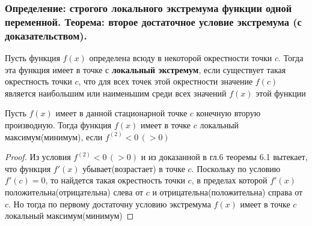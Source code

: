 \documentclass[10pt]{article}
\begin{document}



    \subsubsection{Определение: строгого локального экстремума функции одной переменной. Теорема: второе достаточное условие экстремума (с доказательством).}
    \begin{definition}
        Пусть функция $f(x)$ определена всюду в некоторой окрестности точки $c$. Тогда эта функция имеет в точке с \textbf{локальный экстремум}, если существует такая окрестность точки $c$, что для всех точек этой окрестности значение $f(c)$ является наибольшим или наименьшим среди всех значений $f(x)$ этой функции
    \end{definition}
    \begin{theorem}
        Пусть $f(x)$ имеет в данной стационарной точке $c$ конечную вторую производную. Тогда функция $f(x)$ имеет в точке $c$ локальный максимум(минимум), если $f^{(2)} < 0\,(>0)$ 
    \end{theorem}
    \begin{proof}
        Из условия $f^{(2)} < 0\,(>0)$ и из доказанной в гл.6 теоремы 6.1 вытекает, что функция $f'(x)$ убывает(возрастает) в точке $c$. Поскольку по условию $f'(c) = 0$, то найдется такая окрестность точки $c$, в пределах которой $f'(x)$ положительна(отрицательна) слева от $c$ и отрицательна(положительна) справа от $c$. Но тогда по первому достаточну условию экстремума $f(x)$ имеет в точке $c$ локальный максимум(минимум)
    \end{proof}
\end{document}
